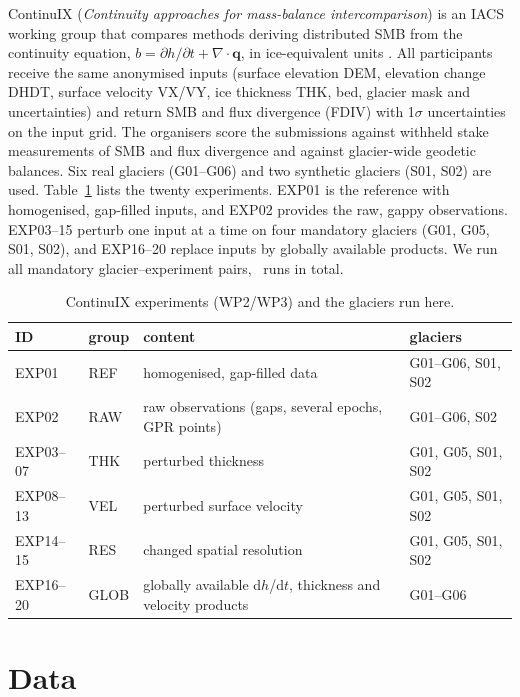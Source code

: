 \documentclass[10pt,a4paper]{article}
\begin{document}
ContinuIX (\emph{Continuity approaches for mass-balance intercomparison}) is an IACS working group that compares methods
deriving distributed SMB from the continuity equation, $b = \partial h/\partial t + \nabla\!\cdot\!\mathbf{q}$, in
ice-equivalent units \citep{continuix}. All participants receive the same anonymised inputs (surface elevation DEM,
elevation change DHDT, surface velocity VX/VY, ice thickness THK, bed, glacier mask and uncertainties) and return SMB
and flux divergence (FDIV) with 1$\sigma$ uncertainties on the input grid. The organisers score the submissions against
withheld stake measurements of SMB and flux divergence and against glacier-wide geodetic balances.
Six real glaciers (G01--G06) and two synthetic glaciers (S01, S02) are used. Table~\ref{tab:exp} lists the twenty
experiments. EXP01 is the reference with homogenised, gap-filled inputs, and EXP02 provides the raw, gappy observations.
EXP03--15 perturb one input at a time on four mandatory glaciers (G01, G05, S01, S02), and EXP16--20 replace inputs by
globally available products. We run all mandatory glacier--experiment pairs, \NQueue\ runs in total.

\begin{table}[!htb]
\centering\small
\caption{ContinuIX experiments (WP2/WP3) and the glaciers run here.}
\label{tab:exp}
\begin{tabular}{lll l}
\toprule
ID & group & content & glaciers \\
\midrule
EXP01 & REF & homogenised, gap-filled data & G01--G06, S01, S02 \\
EXP02 & RAW & raw observations (gaps, several epochs, GPR points) & G01--G06, S02 \\
EXP03--07 & THK & perturbed thickness & G01, G05, S01, S02 \\
EXP08--13 & VEL & perturbed surface velocity & G01, G05, S01, S02 \\
EXP14--15 & RES & changed spatial resolution & G01, G05, S01, S02 \\
EXP16--20 & GLOB & globally available d$h$/d$t$, thickness and velocity products & G01--G06 \\
\bottomrule
\end{tabular}
\end{table}

\section{Data}
\end{document}
